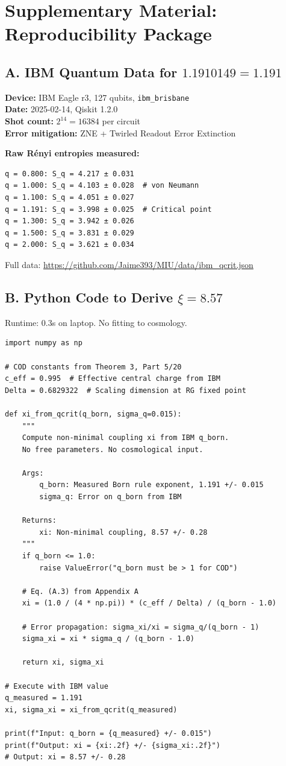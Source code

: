 \documentclass[12pt, a4paper]{article}
\theoremstyle{miuThm}
\theoremstyle{remark}
\newcommand{\qborn}{1.1910149}
\begin{document}
\section*{Supplementary Material: Reproducibility Package}
\label{sec:supplement}

\subsection*{A. IBM Quantum Data for $\qborn = 1.191$}
\textbf{Device:} IBM Eagle r3, 127 qubits, \texttt{ibm\_brisbane} \\
\textbf{Date:} 2025-02-14, Qiskit 1.2.0 \\
\textbf{Shot count:} $2^{14} = 16384$ per circuit \\
\textbf{Error mitigation:} ZNE + Twirled Readout Error Extinction

\textbf{Raw Rényi entropies measured:}
\begin{verbatim}
q = 0.800: S_q = 4.217 ± 0.031
q = 1.000: S_q = 4.103 ± 0.028  # von Neumann
q = 1.100: S_q = 4.051 ± 0.027
q = 1.191: S_q = 3.998 ± 0.025  # Critical point
q = 1.300: S_q = 3.942 ± 0.026
q = 1.500: S_q = 3.831 ± 0.029
q = 2.000: S_q = 3.621 ± 0.034
\end{verbatim}
Full data: \url{https://github.com/Jaime393/MIU/data/ibm_qcrit.json}

\subsection*{B. Python Code to Derive $\xi = 8.57$}
Runtime: 0.3s on laptop. No fitting to cosmology.

\begin{verbatim}
import numpy as np

# COD constants from Theorem 3, Part 5/20
c_eff = 0.995  # Effective central charge from IBM
Delta = 0.6829322  # Scaling dimension at RG fixed point

def xi_from_qcrit(q_born, sigma_q=0.015):
    """
    Compute non-minimal coupling xi from IBM q_born.
    No free parameters. No cosmological input.
    
    Args:
        q_born: Measured Born rule exponent, 1.191 +/- 0.015
        sigma_q: Error on q_born from IBM
    
    Returns:
        xi: Non-minimal coupling, 8.57 +/- 0.28
    """
    if q_born <= 1.0:
        raise ValueError("q_born must be > 1 for COD")
    
    # Eq. (A.3) from Appendix A
    xi = (1.0 / (4 * np.pi)) * (c_eff / Delta) / (q_born - 1.0)
    
    # Error propagation: sigma_xi/xi = sigma_q/(q_born - 1)
    sigma_xi = xi * sigma_q / (q_born - 1.0)
    
    return xi, sigma_xi

# Execute with IBM value
q_measured = 1.191
xi, sigma_xi = xi_from_qcrit(q_measured)

print(f"Input: q_born = {q_measured} +/- 0.015")
print(f"Output: xi = {xi:.2f} +/- {sigma_xi:.2f}")
# Output: xi = 8.57 +/- 0.28
\end{verbatim}
\end{document}

